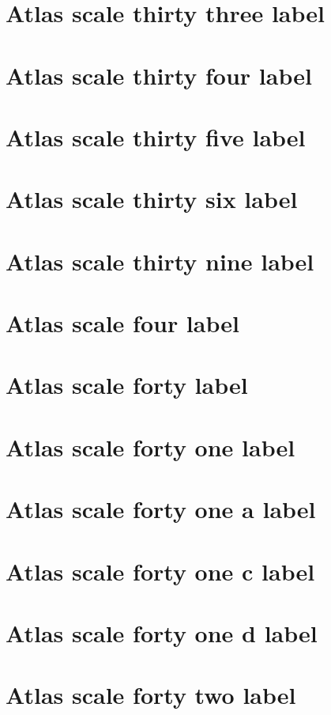 \documentclass[11pt]{article}
\theoremstyle{definition}
\begin{document}
\section{Atlas scale thirty three label}
\label{ll:labels:atlas-s33}
\section{Atlas scale thirty four label}
\label{ll:labels:atlas-s34}
\section{Atlas scale thirty five label}
\label{ll:labels:atlas-s35}
\section{Atlas scale thirty six label}
\label{ll:labels:atlas-s36}
\section{Atlas scale thirty nine label}
\label{ll:labels:atlas-s39}
\section{Atlas scale four label}
\label{ll:labels:atlas-s4}
\section{Atlas scale forty label}
\label{ll:labels:atlas-s40}
\section{Atlas scale forty one label}
\label{ll:labels:atlas-s41}
\section{Atlas scale forty one a label}
\label{ll:labels:atlas-s41a}
\section{Atlas scale forty one c label}
\label{ll:labels:atlas-s41c}
\section{Atlas scale forty one d label}
\label{ll:labels:atlas-s41d}
\section{Atlas scale forty two label}
\label{ll:labels:atlas-s42}
\end{document}

